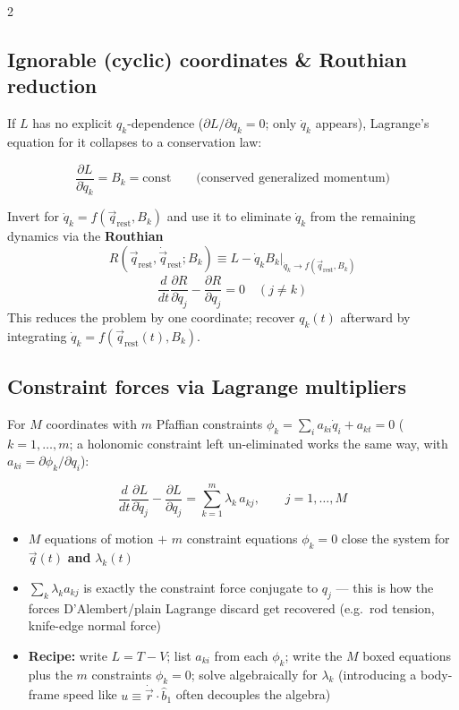\documentclass[10pt]{article}
\begin{document}
\begin{multicols}{2}
\subsection*{Ignorable (cyclic) coordinates \& Routhian reduction}
If $L$ has no explicit $q_k$-dependence ($\partial L/\partial q_k=0$; only $\dot q_k$ appears), Lagrange's equation for it collapses to a conservation law:
\begin{keybox}
\[
    \frac{\partial L}{\partial\dot q_k} = B_k = \text{const} \qquad\text{(conserved generalized momentum)}
\]
\end{keybox}
Invert for $\dot q_k=f(\vec q_{\text{rest}},B_k)$ and use it to eliminate $\dot q_k$ from the remaining dynamics via the \textbf{Routhian}
\[
    R(\vec q_{\text{rest}},\dot{\vec q}_{\text{rest}};B_k) \equiv L - \dot q_k B_k\Big|_{\dot q_k\to f(\vec q_{\text{rest}},B_k)}
\]
\[
    \frac{d}{dt}\frac{\partial R}{\partial\dot q_j}-\frac{\partial R}{\partial q_j}=0 \quad (j\neq k)
\]
This reduces the problem by one coordinate; recover $q_k(t)$ afterward by integrating $\dot q_k=f(\vec q_{\text{rest}}(t),B_k)$.

\subsection*{Constraint forces via Lagrange multipliers}
For $M$ coordinates with $m$ Pfaffian constraints $\phi_k=\sum_ia_{ki}\dot q_i+a_{kt}=0$ ($k=1,\dots,m$; a holonomic constraint left un-eliminated works the same way, with $a_{ki}=\partial\phi_k/\partial q_i$):
\begin{keybox}
\[
    \frac{d}{dt}\frac{\partial L}{\partial\dot q_j}-\frac{\partial L}{\partial q_j} = \sum_{k=1}^{m}\lambda_k\,a_{kj}, \qquad j=1,\dots,M
\]
\end{keybox}
\begin{itemize}[nosep, leftmargin=1.1em]
    \item $M$ equations of motion $+$ $m$ constraint equations $\phi_k=0$ close the system for $\vec q(t)$ \textbf{and} $\lambda_k(t)$
    \item $\sum_k\lambda_k a_{kj}$ is exactly the constraint force conjugate to $q_j$ --- this is how the forces D'Alembert/plain Lagrange discard get recovered (e.g.\ rod tension, knife-edge normal force)
    \item \textbf{Recipe:} write $L=T-V$; list $a_{ki}$ from each $\phi_k$; write the $M$ boxed equations plus the $m$ constraints $\phi_k=0$; solve algebraically for $\lambda_k$ (introducing a body-frame speed like $u\equiv\dot{\vec r}\cdot\hat b_1$ often decouples the algebra)
\end{itemize}


\end{multicols}
\end{document}
